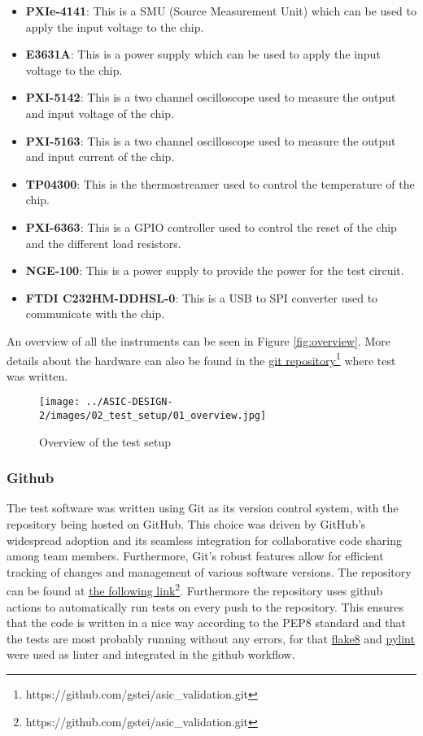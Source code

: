 \begin{itemize}
    \item \textbf{PXIe-4141}: This is a SMU (Source Measurement Unit) which can be used to apply the input voltage to the chip.
    \item \textbf{E3631A}: This is a power supply which can be used to apply the input voltage to the chip.
    \item \textbf{PXI-5142}: This is a two channel oscilloscope used to measure the output and input voltage of the chip.
    \item \textbf{PXI-5163}: This is a two channel oscilloscope used to measure the output and input current of the chip.
    \item \textbf{TP04300}: This is the thermostreamer used to control the temperature of the chip.
    \item \textbf{PXI-6363}: This is a GPIO controller used to control the reset of the chip and the different load resistors.
    \item \textbf{NGE-100}: This is a power supply to provide the power for the test circuit.
    \item \textbf{FTDI C232HM-DDHSL-0}: This is a USB to SPI converter used to communicate with the chip.
\end{itemize}

An overview of all the instruments can be seen in Figure \autoref{fig:overview}. More details about the hardware can also be found in the \href{https://github.com/gstei/asic_validation/}{git repository}\footnote{https://github.com/gstei/asic\_validation.git} where test was written.

\begin{figure}[h]
    \centering
    \texttt{[image: ../ASIC-DESIGN-2/images/02\_test\_setup/01\_overview.jpg]}
    \caption{Overview of the test setup}
    \label{fig:overview}
\end{figure}

\subsubsection{Github}
The test software was written using Git as its version control system, with the repository being hosted on GitHub. This choice was driven by GitHub's widespread adoption and its seamless integration for collaborative code sharing among team members. Furthermore, Git's robust features allow for efficient tracking of changes and management of various software versions. The repository can be found at \href{https://github.com/gstei/asic_validation.git}{the following link}\footnote{https://github.com/gstei/asic\_validation.git}. Furthermore the repository uses github actions to automatically run tests on every push to the repository. This ensures that the code is written in a nice way according to the PEP8 standard and that the tests are most probably running without any errors, for that \href{par:Flake8}{flake8} and \href{par:Pylint}{pylint} were used as linter and integrated in the github workflow.

